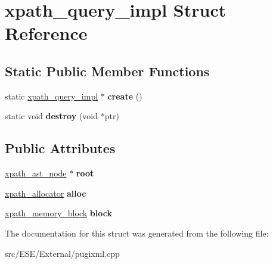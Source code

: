 \hypertarget{structxpath__query__impl}{\section{xpath\-\_\-query\-\_\-impl Struct Reference}
\label{structxpath__query__impl}
}
\subsection*{Static Public Member Functions}
\begin{DoxyCompactItemize}
\item 
\hypertarget{structxpath__query__impl_afcf45bb9a20a4117b1e963d83277aa7f}{static \hyperlink{structxpath__query__impl}{xpath\-\_\-query\-\_\-impl} $\ast$ {\bfseries create} ()}\label{structxpath__query__impl_afcf45bb9a20a4117b1e963d83277aa7f}

\item 
\hypertarget{structxpath__query__impl_a9b7194b1356cca3f3b62f4cdb8d8960f}{static void {\bfseries destroy} (void $\ast$ptr)}\label{structxpath__query__impl_a9b7194b1356cca3f3b62f4cdb8d8960f}

\end{DoxyCompactItemize}
\subsection*{Public Attributes}
\begin{DoxyCompactItemize}
\item 
\hypertarget{structxpath__query__impl_ad25499e0c8391005e3a1a60633d631fe}{\hyperlink{classxpath__ast__node}{xpath\-\_\-ast\-\_\-node} $\ast$ {\bfseries root}}\label{structxpath__query__impl_ad25499e0c8391005e3a1a60633d631fe}

\item 
\hypertarget{structxpath__query__impl_ae568b8642d48e729f2ccc2a50467c847}{\hyperlink{classxpath__allocator}{xpath\-\_\-allocator} {\bfseries alloc}}\label{structxpath__query__impl_ae568b8642d48e729f2ccc2a50467c847}

\item 
\hypertarget{structxpath__query__impl_a3a8af3ceed6a504567656ec6d1b62641}{\hyperlink{structxpath__memory__block}{xpath\-\_\-memory\-\_\-block} {\bfseries block}}\label{structxpath__query__impl_a3a8af3ceed6a504567656ec6d1b62641}

\end{DoxyCompactItemize}


The documentation for this struct was generated from the following file\-:\begin{DoxyCompactItemize}
\item 
src/\-E\-S\-E/\-External/pugixml.\-cpp\end{DoxyCompactItemize}

